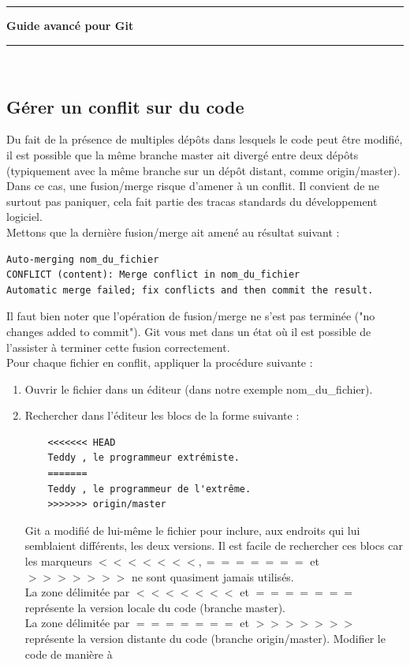 \documentclass[a4paper,10pt]{article}
\newcommand{\HRule}{\rule{\linewidth}{0.1mm}}
\begin{document}
\begin{spacing}{1.5}
\newpage
\HRule
\begin{center}
  \LARGE \textbf{Guide avancé pour Git}
\end{center}
\HRule \\

\subsection*{Gérer un conflit sur du code}
Du fait de la présence de multiples dépôts dans lesquels le code peut être
modifié, il est possible que la même branche master ait divergé entre deux
dépôts (typiquement avec la même branche sur un dépôt distant, comme
origin/master). Dans ce cas, une fusion/merge risque d'amener à un conflit. Il
convient de ne surtout pas paniquer, cela fait partie des tracas standards du
développement logiciel.\\
Mettons que la dernière fusion/merge ait amené au résultat suivant :
\begin{lstlisting}
Auto-merging nom_du_fichier
CONFLICT (content): Merge conflict in nom_du_fichier
Automatic merge failed; fix conflicts and then commit the result.
\end{lstlisting}
Il faut bien noter que l'opération de fusion/merge ne s'est pas terminée ("no
changes added to commit"). Git vous met dans un état où il est possible de
l'assister à terminer cette fusion correctement.\\
Pour chaque fichier en conflit, appliquer la procédure suivante :
\begin{enumerate}
\item Ouvrir le fichier dans un éditeur (dans notre exemple nom\_du\_fichier).
\item Rechercher dans l'éditeur les blocs de la forme suivante :
  \begin{lstlisting}
    <<<<<<< HEAD
    Teddy , le programmeur extrémiste.
    =======
    Teddy , le programmeur de l'extrême.
    >>>>>>> origin/master
  \end{lstlisting}
Git a modifié de lui-même le fichier pour inclure, aux endroits qui lui
semblaient différents, les deux versions. Il est facile de rechercher ces blocs
car les marqueurs $<<<<<<<, =======$ et $>>>>>>>$ ne sont quasiment jamais utilisés.\\
La zone délimitée par $<<<<<<<$ et $=======$ représente la version locale du
code (branche master).\\ La zone délimitée par $=======$ et $>>>>>>>$ représente la
version distante du code (branche origin/master). Modifier le code de manière à

\end{enumerate}
\end{spacing}
\end{document}
